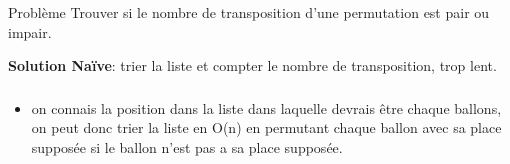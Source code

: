 
\begin{frame}
    \frametitle{\problemtitle}
        \begin{block}
            {Problème} Trouver si le nombre de transposition d'une permutation est pair ou impair.
        \end{block}
        \pause
        \textbf{Solution Naïve}: trier la liste et compter le nombre de transposition, trop lent.
\end{frame}

\begin{frame}
    \frametitle{\problemtitle}
    \begin{itemize}
        \item<+-> on connais la position dans la liste dans laquelle devrais être chaque ballons, on peut donc trier la liste en O(n) en permutant chaque ballon avec sa place supposée si le ballon n'est pas a sa place supposée.
    \end{itemize}
\end{frame}